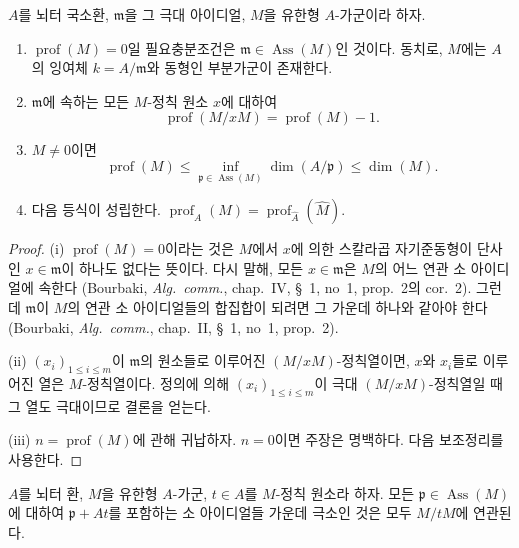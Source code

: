 \begin{proposition}[16.4.6]
\label{0.16.4.6-fr}
$A$를 뇌터 국소환, $\mathfrak{m}$을 그 극대 아이디얼, $M$을 유한형
$A$-가군이라 하자.
\begin{enumerate}
  \item[\rm{(i)}] $\operatorname{prof}(M)=0$일 필요충분조건은
  $\mathfrak{m}\in\operatorname{Ass}(M)$인 것이다. 동치로, $M$에는
  $A$의 잉여체 $k=A/\mathfrak{m}$와 동형인 부분가군이 존재한다.
  \item[\rm{(ii)}] $\mathfrak{m}$에 속하는 모든 $M$-정칙 원소 $x$에
  대하여
  \begin{equation}
  \label{0.16.4.6.1-fr}
  \tag{16.4.6.1}
    \operatorname{prof}(M/xM)=\operatorname{prof}(M)-1.
  \end{equation}
  \item[\rm{(iii)}] $M\neq0$이면
  \begin{equation}
  \label{0.16.4.6.2-fr}
  \tag{16.4.6.2}
    \operatorname{prof}(M)
    \leq\inf_{\mathfrak{p}\in\operatorname{Ass}(M)}\dim(A/\mathfrak{p})
    \leq\dim(M).
  \end{equation}
  \item[\rm{(iv)}] 다음 등식이 성립한다.
  $\operatorname{prof}_A(M)=
  \operatorname{prof}_{\widehat{A}}(\widehat{M})$.
\end{enumerate}
\end{proposition}

\begin{proof}
(i) $\operatorname{prof}(M)=0$이라는 것은 $M$에서 $x$에 의한
스칼라곱 자기준동형이 단사인 $x\in\mathfrak{m}$이 하나도 없다는
뜻이다. 다시 말해, 모든 $x\in\mathfrak{m}$은 $M$의 어느 연관 소
아이디얼에 속한다 (Bourbaki, \emph{Alg.~comm.}, chap.~IV, \S~1,
no~1, prop.~2의 cor.~2). 그런데 $\mathfrak{m}$이 $M$의 연관 소
아이디얼들의 합집합이 되려면 그 가운데 하나와 같아야 한다
(Bourbaki, \emph{Alg.~comm.}, chap.~II, \S~1, no~1, prop.~2).

(ii) $(x_i)_{1\leq i\leq m}$이 $\mathfrak{m}$의 원소들로 이루어진
$(M/xM)$-정칙열이면, $x$와 $x_i$들로 이루어진 열은 $M$-정칙열이다.
정의에 의해 $(x_i)_{1\leq i\leq m}$이 극대 $(M/xM)$-정칙열일 때
그 열도 극대이므로 결론을 얻는다.

(iii) $n=\operatorname{prof}(M)$에 관해 귀납하자. $n=0$이면 주장은
명백하다. 다음 보조정리를 사용한다.
\end{proof}

\begin{lemma}[16.4.6.3]
\label{0.16.4.6.3-fr}
$A$를 뇌터 환, $M$을 유한형 $A$-가군, $t\in A$를 $M$-정칙 원소라
하자. 모든 $\mathfrak{p}\in\operatorname{Ass}(M)$에 대하여
$\mathfrak{p}+At$를 포함하는 소 아이디얼들 가운데 극소인 것은
모두 $M/tM$에 연관된다.
\end{lemma}

